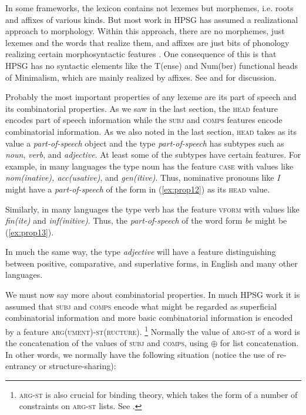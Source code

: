 \documentclass[output=paper
	        ,collection
	        ,collectionchapter
 	        ,biblatex
                ,babelshorthands
                ,newtxmath
                ,draftmode
                ,colorlinks, citecolor=brown
]{langscibook}
\begin{document}
In some frameworks, the lexicon contains not lexemes but morphemes, i.e. roots and affixes of various kinds. But most work in HPSG has assumed a realizational approach to morphology. Within this approach, there are no morphemes, just lexemes and the words that realize them, and affixes are just bits of phonology realizing certain morphosyntactic features \citep{Stump2001a-u-kopiert,Anderson92a-u}. One consequence of this is that HPSG has no syntactic elements like the T(ense) and Num(ber) functional heads of Minimalism, which are mainly realized by affixes. See  and  for discussion.

Probably the most important properties of any lexeme are its part of speech and its combinatorial properties. As we saw in the last section, the \textsc{head} feature encodes part of speech information while the \textsc{subj} and \textsc{comps} features encode combinatorial information. As we also noted in the last section, \textsc{head} takes as its value a \emph{part-of-speech} object and the type \emph{part-of-speech} has subtypes such as \emph{noun}, \emph{verb}, and \emph{adjective}. At least some of the subtypes have certain features. For example, in many languages the type noun has the feature \textsc{case} with values like \emph{nom(inative), acc(usative)}, and \emph{gen(itive)}. Thus, nominative pronouns like \emph{I} might have a \emph{part-of-speech} of the form in (\ref{ex:prop12}) as its \textsc{head} value.

\ea\label{ex:prop12}
\z

Similarly, in many languages the type verb has the feature \textsc{vform} with values like \emph{fin(ite)} and \emph{inf(initive)}. Thus, the \emph{part-of-speech} of the word form \emph{be} might be (\ref{ex:prop13}).

\ea\label{ex:prop13}
\z

In much the same way, the type \emph{adjective} will have a feature distinguishing between positive, comparative, and superlative forms, in English and many other languages.

We must now say more about combinatorial properties. In much HPSG work it is assumed that \textsc{subj} and \textsc{comps} encode what might be regarded as superficial combinatorial information and more basic combinatorial information is encoded by a feature \textsc{arg(ument)-st(ructure)}.%
%
\footnote{\textsc{arg-st} is also crucial for binding theory, which takes the form of a number of constraints on \textsc{arg-st} lists. See .}
%
Normally the value of \textsc{arg-st} of a word is the concatenation of the values of \textsc{subj} and \textsc{comps}, using $\oplus$ for list concatenation. In other words, we normally have the following situation (notice the use of re-entrancy or structure-sharing):
\end{document}
